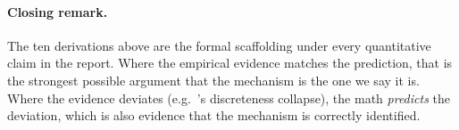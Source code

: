 \paragraph{Closing remark.}
The ten derivations above are the formal scaffolding under every
quantitative claim in the report. Where the empirical evidence
matches the prediction, that is the strongest possible argument
that the mechanism is the one we say it is. Where the evidence
deviates (e.g.\ \cvar{}'s discreteness collapse), the math
\emph{predicts} the deviation, which is also evidence that the
mechanism is correctly identified.
